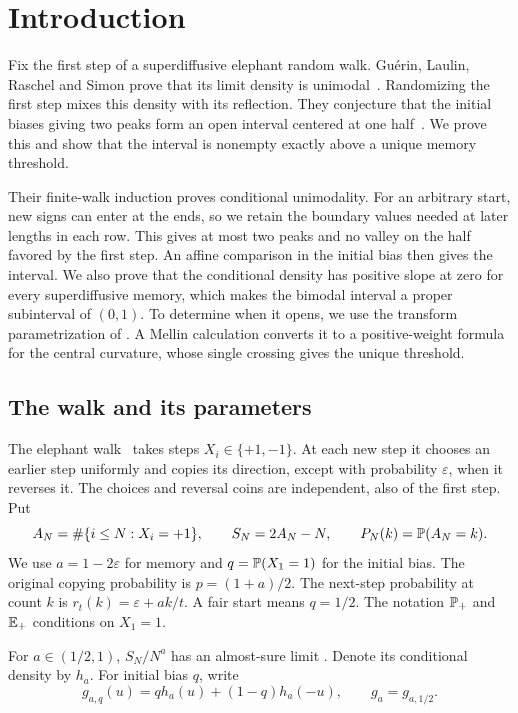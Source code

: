 \section{Introduction}\label{sec:intro}

Fix the first step of a superdiffusive elephant random walk.
Gu\'erin, Laulin, Raschel and Simon prove that its limit density is
unimodal~\cite[Theorem~1.1]{glrs2025}. Randomizing the first step
mixes this density with its reflection. They conjecture that the
initial biases giving two peaks form an open interval centered at
one half~\cite[Remark~2.1(b)]{glrs2025}. We prove this and show
that the interval is nonempty exactly above a unique memory threshold.

Their finite-walk induction proves conditional unimodality. For an
arbitrary start, new signs can enter at the ends, so we retain the
boundary values needed at later lengths in each row. This gives
at most two peaks and no valley on the half favored by the first
step. An affine comparison in the initial bias then gives the
interval. We also prove that the conditional density has positive
slope at zero for every superdiffusive memory, which makes the
bimodal interval a proper subinterval of $(0,1)$. To determine when
it opens, we use the transform parametrization of
\cite[Proposition~3.2]{glrs2025}. A Mellin calculation converts it
to a positive-weight formula for the central curvature, whose
single crossing gives the unique threshold.

\subsection{The walk and its parameters}\label{sec:notation}

The elephant walk~\cite{schutz2004} takes steps $X_i\in\{+1,-1\}$.
At each new step it chooses an earlier step uniformly and copies
its direction, except with probability $\varepsilon$, when it
reverses it. The choices and reversal coins are independent, also
of the first step. Put
\[
 A_N=\#\{i\le N:X_i=+1\},\qquad S_N=2A_N-N,\qquad
 P_N(k)=\mathbb{P}(A_N=k).
\]
We use $a=1-2\varepsilon$ for memory and $q=\mathbb{P}(X_1=1)$ for the
initial bias. The original copying probability is $p=(1+a)/2$.
The next-step probability at count $k$ is
$r_t(k)=\varepsilon+ak/t$. A fair start means $q=1/2$.
The notation $\mathbb{P}_+$ and $\mathbb{E}_+$ conditions on $X_1=1$.

For $a\in(1/2,1)$, $S_N/N^a$ has an almost-sure limit
\cite{baurbert2016,bercu2018}. Denote its conditional density by
$h_a$. For initial bias $q$, write
\[
 g_{a,q}(u)=q h_a(u)+(1-q)h_a(-u),\qquad g_a=g_{a,1/2}.
\]

